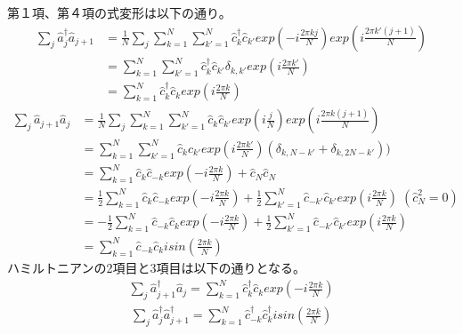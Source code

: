 \documentclass[a4paper,10.5pt]{article}
\numberwithin{equation}{section}
\begin{document}
第１項、第４項の式変形は以下の通り。
\begin{equation}\begin{split}
  \sum_{j} \hat{a}^{\dagger}_{j}\hat{a}_{j+1} 
  &= \frac{1}{N}\sum_{j} \sum_{k=1}^{N}\sum_{k'=1}^{N} \hat{c}_{k}^{\dagger} \hat{c}_{k'} exp(-i\frac{2\pi kj}{N})exp(i\frac{2\pi k'(j+1)}{N})\\
  &= \sum_{k=1}^{N}\sum_{k'=1}^{N} \hat{c}_{k}^{\dagger} \hat{c}_{k'} \delta_{k,k'}
  exp(i\frac{2\pi k'}{N})\\
  &= \sum_{k=1}^{N} \hat{c}_{k}^{\dagger} \hat{c}_{k} exp(i\frac{2\pi k}{N})
\end{split} \end{equation}
\begin{equation}\begin{split}
    \sum_{j} \hat{a}_{j+1} \hat{a}_{j}
    &=\frac{1}{N}\sum_{j} \sum_{k=1}^{N}\sum_{k'=1}^{N}
    \hat{c}_{k} \hat{c}_{k'} exp(i\frac{j}{N})exp(i\frac{2\pi k(j+1)}{N})\\
    &=\sum_{k=1}^{N}\sum_{k'=1}^{N}
    \hat{c}_{k} \hat{c}_{k'} exp(i\frac{2\pi k'}{N})(\delta_{k,N-k'} + \delta_{k,2N-k'}))\\
    &= \sum_{k=1}^{N} \hat{c}_{k} \hat{c}_{-k} exp(-i\frac{2\pi k}{N} ) 
    +\hat{c}_{N} \hat{c}_{N} \\
    &= \frac{1}{2} \sum_{k=1}^{N} \hat{c}_{k} \hat{c}_{-k} exp(-i\frac{2\pi k}{N} ) 
    +\frac{1}{2} \sum_{k'=1}^{N} \hat{c}_{-k'} \hat{c}_{k'} exp(i\frac{2\pi k}{N})\;(\hat{c}_{N}^{2}=0)\\
    &=-\frac{1}{2} \sum_{k=1}^{N} \hat{c}_{-k} \hat{c}_{k} exp(-i\frac{2\pi k}{N} ) +\frac{1}{2} \sum_{k'=1}^{N} \hat{c}_{-k'} \hat{c}_{k'} exp(i\frac{2\pi k}{N})\\
    &=\sum_{k=1}^{N} \hat{c}_{-k} \hat{c}_{k} isin(\frac{2\pi k}{N})
\end{split} \end{equation}
ハミルトニアンの2項目と3項目は以下の通りとなる。
\begin{equation}\begin{split}
    \sum_{j} \hat{a}^{\dagger}_{j+1}\hat{a}_{j} =\sum_{k=1}^{N} \hat{c}_{k}^{\dagger} \hat{c}_{k} exp(-i\frac{2\pi k}{N})
\end{split} \end{equation}
\begin{equation}\begin{split}
\sum_{j}\hat{a}^{\dagger}_{j}\hat{a}^{\dagger}_{j+1}
=\sum_{k=1}^{N}\hat{c}^{\dagger}_{-k}\hat{c}^{\dagger}_{k}isin(\frac{2\pi k}{N})
\end{split} \end{equation}
\end{document}
